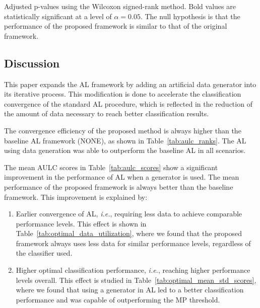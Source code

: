 \documentclass[remotesensing,article,submit,moreauthors,pdftex]{Definitions/mdpi}
\begin{document}
\begin{paracol}{2}
\begin{table}[htb]
	\centering
    \caption{
    	Adjusted p-values using the Wilcoxon signed-rank method. Bold values
        are statistically significant at a level of $\alpha = 0.05$. The 
        null hypothesis is that the performance of the proposed
        framework is similar to that of the original framework.
    }\label{tab:wilcoxon_test}
\end{table}

\subsection{Discussion}

This paper expands the AL framework by adding an artificial data generator
into its iterative process. This modification is done to accelerate the
classification convergence of the standard AL procedure, which is
reflected in the reduction of the amount of data necessary to reach better
classification results.

The convergence efficiency of the proposed method is always higher than the
baseline AL framework (NONE), as shown in Table~\ref{tab:aulc_ranks}. The AL
using data generation was able to outperform the baseline AL in all scenarios. 

The mean AULC scores in Table~\ref{tab:aulc_scores} show a significant
improvement in the performance of AL when a generator is used. The mean
performance of the proposed framework is always better than the
baseline framework. This improvement is explained by:

\begin{enumerate}
    \item Earlier convergence of AL, \textit{i.e.}, requiring less data to
        achieve comparable performance levels. This effect is shown in
        Table~\ref{tab:optimal_data_utilization}, where we found that the
        proposed framework always uses less data for similar performance
        levels, regardless of the classifier used.
    \item Higher optimal classification performance, \textit{i.e.}, reaching
        higher performance levels overall. This effect is studied in
        Table~\ref{tab:optimal_mean_std_scores}, where we found that using a
        generator in AL led to a better classification performance and was
        capable of outperforming the MP threshold. 
\end{enumerate} 


\end{paracol}
\end{document}
